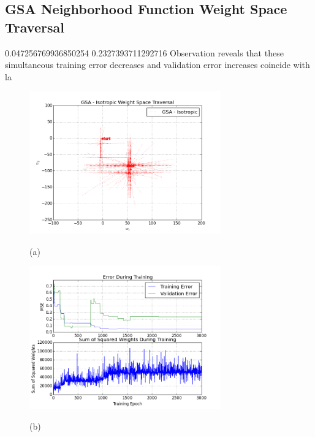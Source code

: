 \documentclass[11pt]{afthesis}
\begin{document}
\begin{figure}[ht!]
  	\end{figure}

	\subsection{GSA Neighborhood Function Weight Space Traversal} 
	0.047256769936850254 0.2327393711292716
	Observation reveals that these simultaneous training error decreases and validation error increases coincide with la

	 
   	\begin{figure}[ht!]
   		
   		\begin{minipage}[b]{0.5\linewidth}
   			\centering
   			\centerline{\includegraphics[width = 3.25in]{figures/weight_space_gsa_i.png}}
   			\centerline{(a)}\medskip
   		\end{minipage}
   		\hfill
   		\begin{minipage}[b]{0.5\linewidth}
   			\centering
   			\centerline{\includegraphics[width = 3.25in]{figures/weight_space_gsa_i_perf.png}}
   			\centerline{(b)}\medskip
   		\end{minipage}
   		\caption{
}
\end{figure}
\end{document}
